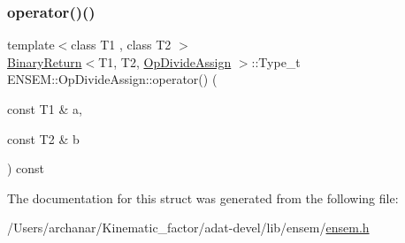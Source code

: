 \subsubsection{\texorpdfstring{operator()()}{operator()()}\hspace{0.1cm}{\footnotesize\ttfamily [3/3]}}
{\footnotesize\ttfamily template$<$class T1 , class T2 $>$ \\
\mbox{\hyperlink{structENSEM_1_1BinaryReturn}{Binary\+Return}}$<$T1, T2, \mbox{\hyperlink{structENSEM_1_1OpDivideAssign}{Op\+Divide\+Assign}} $>$\+::Type\+\_\+t E\+N\+S\+E\+M\+::\+Op\+Divide\+Assign\+::operator() (\begin{DoxyParamCaption}\item[{const T1 \&}]{a,  }\item[{const T2 \&}]{b }\end{DoxyParamCaption}) const\hspace{0.3cm}{\ttfamily [inline]}}



The documentation for this struct was generated from the following file\+:\begin{DoxyCompactItemize}
\item 
/\+Users/archanar/\+Kinematic\+\_\+factor/adat-\/devel/lib/ensem/\mbox{\hyperlink{adat-devel_2lib_2ensem_2ensem_8h}{ensem.\+h}}\end{DoxyCompactItemize}

